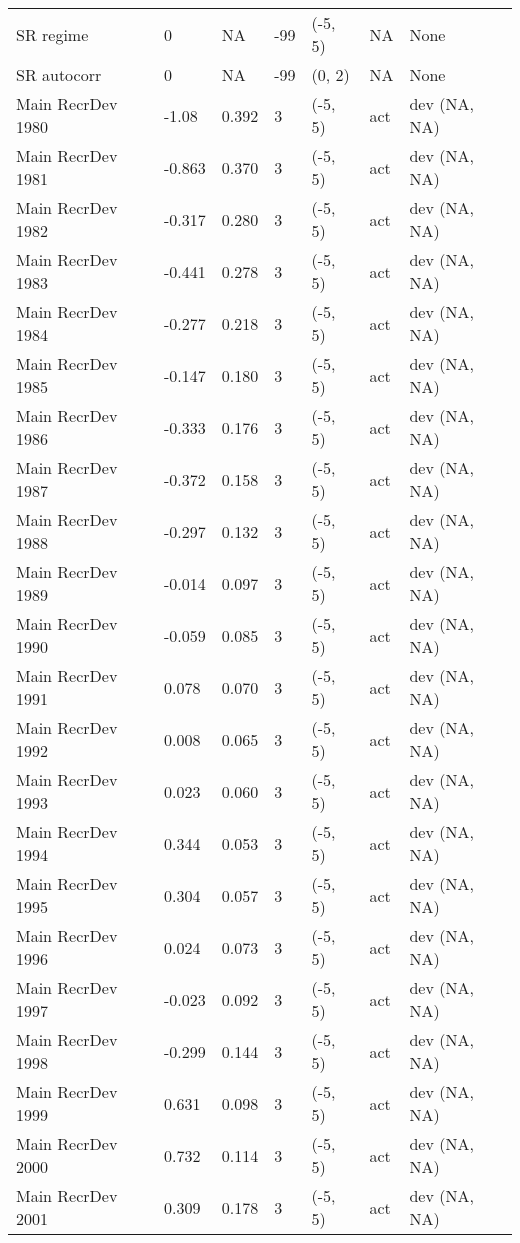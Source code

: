 \documentclass[11pt,
  english,
  letterpaper,
]{article}
\begin{document}
\begin{landscape}
\begin{longtable}[t]{>{\raggedright\arraybackslash}p{7.5cm}lllll>{\raggedright\arraybackslash}p{3.5cm}}
SR regime & 0 & NA & -99 & (-5, 5) & NA & None\\
SR autocorr & 0 & NA & -99 & (0, 2) & NA & None\\
Main RecrDev 1980 & -1.08 & 0.392 & 3 & (-5, 5) & act & dev (NA, NA)\\
Main RecrDev 1981 & -0.863 & 0.370 & 3 & (-5, 5) & act & dev (NA, NA)\\
Main RecrDev 1982 & -0.317 & 0.280 & 3 & (-5, 5) & act & dev (NA, NA)\\
Main RecrDev 1983 & -0.441 & 0.278 & 3 & (-5, 5) & act & dev (NA, NA)\\
Main RecrDev 1984 & -0.277 & 0.218 & 3 & (-5, 5) & act & dev (NA, NA)\\
Main RecrDev 1985 & -0.147 & 0.180 & 3 & (-5, 5) & act & dev (NA, NA)\\
Main RecrDev 1986 & -0.333 & 0.176 & 3 & (-5, 5) & act & dev (NA, NA)\\
Main RecrDev 1987 & -0.372 & 0.158 & 3 & (-5, 5) & act & dev (NA, NA)\\
Main RecrDev 1988 & -0.297 & 0.132 & 3 & (-5, 5) & act & dev (NA, NA)\\
Main RecrDev 1989 & -0.014 & 0.097 & 3 & (-5, 5) & act & dev (NA, NA)\\
Main RecrDev 1990 & -0.059 & 0.085 & 3 & (-5, 5) & act & dev (NA, NA)\\
Main RecrDev 1991 & 0.078 & 0.070 & 3 & (-5, 5) & act & dev (NA, NA)\\
Main RecrDev 1992 & 0.008 & 0.065 & 3 & (-5, 5) & act & dev (NA, NA)\\
Main RecrDev 1993 & 0.023 & 0.060 & 3 & (-5, 5) & act & dev (NA, NA)\\
Main RecrDev 1994 & 0.344 & 0.053 & 3 & (-5, 5) & act & dev (NA, NA)\\
Main RecrDev 1995 & 0.304 & 0.057 & 3 & (-5, 5) & act & dev (NA, NA)\\
Main RecrDev 1996 & 0.024 & 0.073 & 3 & (-5, 5) & act & dev (NA, NA)\\
Main RecrDev 1997 & -0.023 & 0.092 & 3 & (-5, 5) & act & dev (NA, NA)\\
Main RecrDev 1998 & -0.299 & 0.144 & 3 & (-5, 5) & act & dev (NA, NA)\\
Main RecrDev 1999 & 0.631 & 0.098 & 3 & (-5, 5) & act & dev (NA, NA)\\
Main RecrDev 2000 & 0.732 & 0.114 & 3 & (-5, 5) & act & dev (NA, NA)\\
Main RecrDev 2001 & 0.309 & 0.178 & 3 & (-5, 5) & act & dev (NA, NA)\\

\end{longtable}
\end{landscape}
\end{document}
